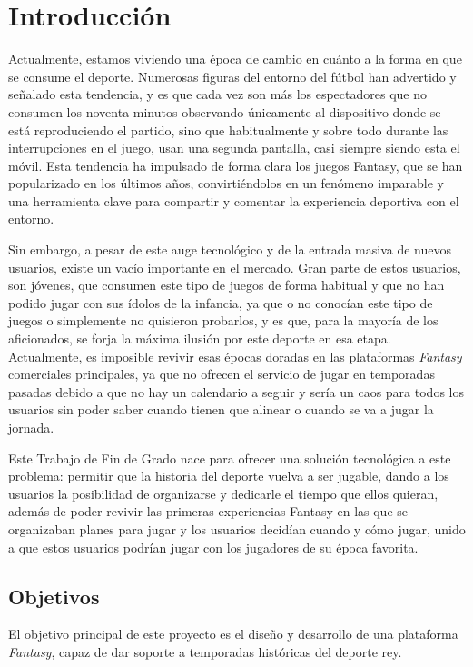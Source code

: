 \chapter{Introducción}
\label{chap:introduccion}

Actualmente, estamos viviendo una época de cambio en cuánto a la forma en que se consume el deporte. Numerosas figuras del entorno del fútbol han advertido y señalado esta tendencia, y es que cada vez son más los espectadores que no consumen los noventa minutos observando únicamente al dispositivo donde se está reproduciendo el partido, sino que habitualmente y sobre todo durante las interrupciones en el juego, usan una segunda pantalla, casi siempre siendo esta el móvil. Esta tendencia ha impulsado de forma clara los juegos Fantasy, que se han popularizado en los últimos años, convirtiéndolos en un fenómeno imparable y una herramienta clave para compartir y comentar la experiencia deportiva con el entorno.

Sin embargo, a pesar de este auge tecnológico y de la entrada masiva de nuevos usuarios, existe un vacío importante en el mercado. Gran parte de estos usuarios, son jóvenes, que consumen este tipo de juegos de forma habitual y que no han podido jugar con sus ídolos de la infancia, ya que o no conocían este tipo de juegos o simplemente no quisieron probarlos, y es que, para la mayoría de los aficionados, se forja la máxima ilusión por este deporte en esa etapa. Actualmente, es imposible revivir esas épocas doradas en las plataformas \textit{Fantasy} comerciales principales, ya que no ofrecen el servicio de jugar en temporadas pasadas debido a que no hay un calendario a seguir y sería un caos para todos los usuarios sin poder saber cuando tienen que alinear o cuando se va a jugar la jornada.

Este Trabajo de Fin de Grado nace para ofrecer una solución tecnológica a este problema: permitir que la historia del deporte vuelva a ser jugable, dando a los usuarios la posibilidad de organizarse y dedicarle el tiempo que ellos quieran, además de poder revivir las primeras experiencias Fantasy en las que se organizaban planes para jugar y los usuarios decidían cuando y cómo jugar, unido a que estos usuarios podrían jugar con los jugadores de su época favorita.

\section{Objetivos}
El objetivo principal de este proyecto es el diseño y desarrollo de una plataforma \textit{Fantasy}, capaz de dar soporte a temporadas históricas del deporte rey. 

